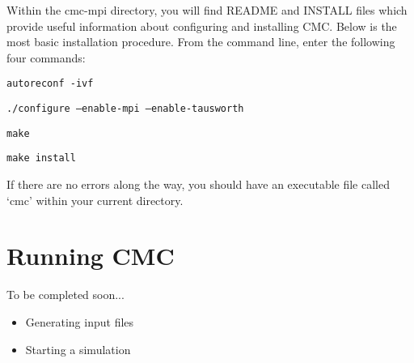 \documentclass[11pt]{article}
\begin{document}
\begin{itemize}




Within the cmc-mpi directory, you will find README and INSTALL files which provide useful information about configuring and installing CMC. Below is the most basic installation procedure. From the command line, enter the following four commands:

{\addtolength{\leftskip}{10mm} \texttt{autoreconf -ivf}

\texttt{./configure --enable-mpi --enable-tausworth}

\texttt{make}

\texttt{make install}

}
%
%
%

If there are no errors along the way, you should have an executable file called `cmc' within your current directory.

\end{itemize}



\section{Running CMC}
To be completed soon...
\begin{itemize}
\item Generating input files
\item Starting a simulation
\end{itemize}
\end{document}
